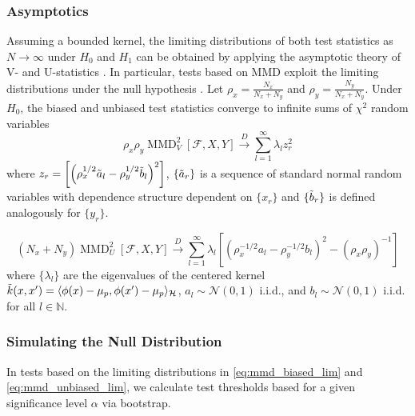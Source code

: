 \documentclass[a4paper,11pt]{article}
\begin{document}
\subsubsection{Asymptotics}
Assuming a bounded kernel, the limiting distributions of both test statistics as $N \rightarrow \infty$ under $H_{0}$ and $H_{1}$ can be obtained by applying the asymptotic theory of V- and U-statistics \cite{serfling_approximation_nodate}. In particular, tests based on MMD exploit the limiting distributions under the null hypothesis \cite{gretton_kernel_2012, chwialkowski_wild_2016}. Let $\rho_{x} =\frac{N_{x}}{N_{x} + N_{y}}$ and $\rho_{y} = \frac{N_{y}}{N_{x} + N_{y}}$. Under $H_{0}$, the biased and unbiased test statistics converge to infinite sums of $\chi^{2}$ random variables
\begin{equation}
    \rho_{x}\rho_{y} \operatorname{MMD}_{V}^{2}[\mathcal{F}, X, Y] \overset{D}{\rightarrow} \sum_{l=1}^{\infty} \lambda_{l}z_{r}^{2}
    \label{eq:mmd_biased_lim}
\end{equation}
where $z_{r} = \left[\left(\rho_{x}^{1 / 2} \Tilde{a}_{l}-\rho_{y}^{1 / 2} \Tilde{b}_{l}\right)^{2}\right]$, $\{\Tilde{a}_{r}\}$ is a sequence of standard normal random variables with dependence structure dependent on $\{x_{r}\}$ and $\{\Tilde{b}_{r}\}$ is defined analogously for $\{y_{r}\}$.

\begin{equation}
    (N_{x}+N_{y}) \operatorname{MMD}_{U}^{2}[\mathcal{F}, X, Y] \overset{D}{\rightarrow} \sum_{l=1}^{\infty} \lambda_{l}\left[\left(\rho_{x}^{-1 / 2} a_{l}-\rho_{y}^{-1 / 2} b_{l}\right)^{2}-\left(\rho_{x} \rho_{y}\right)^{-1}\right]
    \label{eq:mmd_unbiased_lim}
\end{equation}
where $\{\lambda_{l}\}$ are the eigenvalues of the centered kernel $\Tilde{k}(x, x') = \langle \phi(x) - \mathbf{\mu}_{p}, \phi(x') - \mathbf{\mu}_{p} \rangle_{\mathcal{H}}$, $a_{l} \sim \mathcal{N}(0, 1)$ i.i.d., and $b_{l} \sim \mathcal{N}(0, 1)$ i.i.d. for all $l \in \mathbb{N}$.

\subsubsection{Simulating the Null Distribution}
In tests based on the limiting distributions in \ref{eq:mmd_biased_lim} and \ref{eq:mmd_unbiased_lim}, we calculate test thresholds based for a given significance level $\alpha$ via bootstrap.
\end{document}
